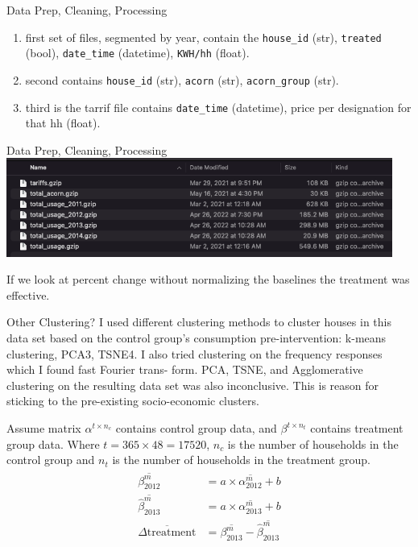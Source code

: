 \documentclass{beamer}
\begin{document}
\begin{frame}{Data Prep, Cleaning, Processing}
  \begin{enumerate}
    \item<+-> first set of files, segmented by year, contain the \texttt{house\_id} (str), \texttt{treated} (bool), \texttt{date\_time} (datetime), \texttt{KWH/hh} (float).
    \item<+-> second contains \texttt{house\_id} (str), \texttt{acorn} (str), \texttt{acorn\_group} (str).
    \item<+-> third is the tarrif file contains \texttt{date\_time} (datetime), price per designation for that hh (float).
  \end{enumerate}
\end{frame}

\begin{frame}{Data Prep, Cleaning, Processing}
  \includegraphics[width=0.95\textwidth]{images/lcl-clean-files.png}
\end{frame}

\begin{frame}{}
  If we look at percent change without normalizing the baselines the treatment was effective.
\end{frame}

\begin{frame}{Other Clustering?}
  I used different clustering methods to cluster houses in this data set based on the control group’s consumption pre-intervention: k-means clustering, PCA3, TSNE4. I also tried clustering on the frequency responses which I found fast Fourier trans- form. PCA, TSNE, and Agglomerative clustering on the resulting data set was also inconclusive. This is reason for sticking to the pre-existing socio-economic clusters.
\end{frame}

\begin{frame}
  Assume matrix $\alpha^{t \times n_c}$ contains control group data, and $\beta^{t \times n_t}$ contains treatment group data. Where $t = 365 \times 48 = 17520$, $n_c$ is the number of households in the control group and $n_t$ is the number of households in the treatment group.
  \begin{align}
    \begin{split}
      \overline{\beta^m_{2012}} &= a \times \overline{\alpha^m_{2012}} + b \\
      \overline{\hat{\beta}^m_{2013}} &= a \times \overline{\alpha^m_{2013}} + b \\
      \overline{\Delta\mbox{treatment}} &= \overline{\beta^m_{2013}} - \overline{\hat{\beta}^m_{2013}}
    \end{split}
  \end{align}
\end{frame}
\end{document}
